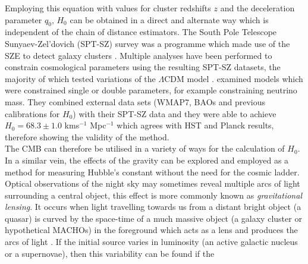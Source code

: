 \documentclass[12pt, onecolumn]{revtex4}    %
\begin{document}
Employing this equation with values for cluster redshifts $z$ and the deceleration parameter $q_0$, $H_0$ can be obtained in a direct and alternate way which is independent of the chain of distance estimators. The South Pole Telescope Sunyaev-Zel'dovich (SPT-SZ) survey was a programme which made use of the SZE to detect galaxy clusters \citep{2009AIPC.1185..475C}. Multiple analyses have been performed to constrain cosmological parameters using the resulting SPT-SZ datasets, the majority of which tested variations of the $\Lambda$CDM model \citep{2014ApJ...782...74H, 2016ApJ...832...95D}. \cite{2014ApJ...782...74H} examined models which were constrained single or double parameters, for example constraining neutrino mass. They combined external data sets (WMAP7, BAOs and previous calibrations for $H_0$) with their SPT-SZ data and they were able to achieve $H_0=68.3\pm1.0$ kms$^{-1}$ Mpc$^{-1}$ which agrees with HST and Planck results, therefore showing the validity of the method. \\


The CMB can therefore be utilised in a variety of ways for the calculation of $H_0$. In a similar vein, the effects of the gravity can be explored and employed as a method for measuring Hubble's constant without the need for the cosmic ladder. \\

Optical observations of the night sky may sometimes reveal multiple arcs of light surrounding a central object, this effect is more commonly known as \textit{gravitational lensing}. It occurs when light travelling towards us from a distant bright object (a quasar) is curved by the space-time of a much massive object (a galaxy cluster or hypothetical MACHOs) in the foreground which acts as a lens and produces the arcs of light \citep{carroll_astro}. If the initial source varies in luminosity (an active galactic nucleus or a supernovae), then this variability can be found if the 





\newpage





\newpage
\end{document}

